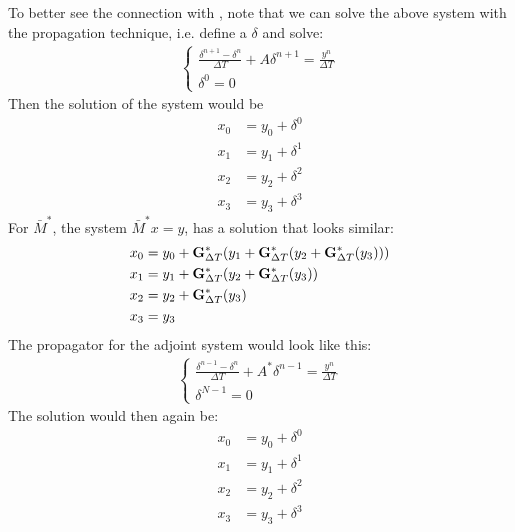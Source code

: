 \documentclass[11pt,a4paper]{article}
\begin{document}
To better see the connection with \cite{lions2001resolution}, note that we can solve the above system with the propagation technique, i.e. define a $\delta$ and solve:
\begin{align}
\left\{
     \begin{array}{lr}
		\frac{\delta^{n+1} -\delta^n }{\Delta T } + A\delta^{n+1} = \frac{y^n}{\Delta T} \\
		\delta^0 = 0
	\end{array} \right.
\end{align} 
Then the solution of the system would be 
\begin{align*}
x_0 &=y_0 +\delta^0\\
x_1 &=y_1 + \delta^1 \\
x_2 &=y_2 +\delta^2\\
x_3 &=y_3 + \delta^3 
\end{align*}
For $\bar{M}^{*}$, the system $\bar{M}^{*}x=y$, has a solution that looks similar:
\begin{align*}
x_0 &=y_0 +\bold{G}_{\Delta T}^*(y_1 + \bold{G}_{\Delta T}^*(y_2 + \bold{G}_{\Delta T}^*(y_ 3)))\\
x_1 &=y_1 + \bold{G}_{\Delta T}^*(y_2 + \bold{G}_{\Delta T}^*(y_ 3))\\
x_2 &=y_2 + \bold{G}_{\Delta T}^*(y_ 3) \\
x_3 &=y_3 
\end{align*}
The propagator for the adjoint system would look like this:
\begin{align}
\left\{
     \begin{array}{lr}
		\frac{\delta^{n-1} -\delta^n }{\Delta T } + A^*\delta^{n-1} = \frac{y^n}{\Delta T} \\
		\delta^{N-1} = 0
	\end{array} \right.
\end{align} 
The solution would then again be:
\begin{align*}
x_0 &=y_0 +\delta^0\\
x_1 &=y_1 + \delta^1 \\
x_2 &=y_2 +\delta^2\\
x_3 &=y_3 + \delta^3 
\end{align*}


\end{document}
